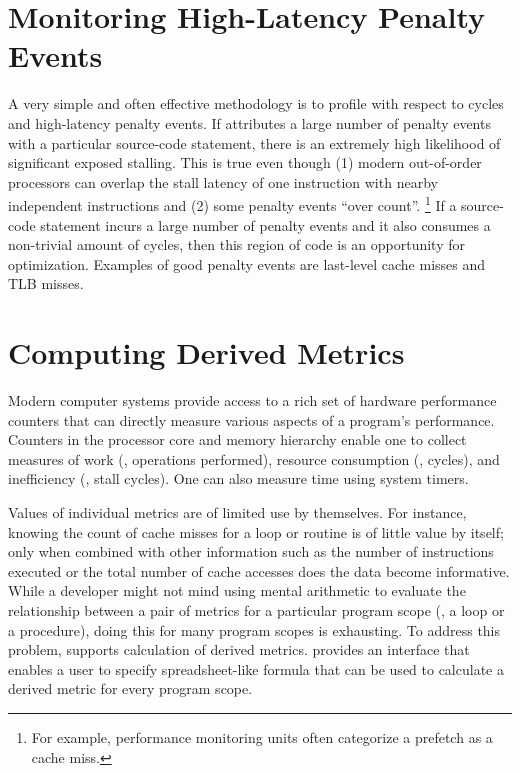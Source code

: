 \documentclass[11pt,twoside,letterpaper]{report}
\begin{document}

\section{Monitoring High-Latency Penalty Events}
\label{sec:effective-performance-analysis:penalty-events}

A very simple and often effective methodology is to profile with respect to cycles and high-latency penalty events.
If \HPCToolkit{} attributes a large number of penalty events with a particular source-code statement, there is an extremely high likelihood of significant exposed stalling.
This is true even though (1) modern out-of-order processors can overlap the stall latency of one instruction with nearby independent instructions and (2) some penalty events ``over count''.%
\footnote{For example, performance monitoring units often categorize a prefetch as a cache miss.}
If a source-code statement incurs a large number of penalty events and it also consumes a non-trivial amount of cycles, then this region of code is an opportunity for optimization.
Examples of good penalty events are last-level cache misses and TLB misses.



\section{Computing Derived Metrics}
\label{sec:effective-performance-analysis:derived-metrics}

Modern computer systems provide access to a rich set of hardware performance counters that can directly measure various aspects of a program's performance.
Counters in the processor core and memory hierarchy enable one to collect measures of work (\eg, operations performed), resource consumption (\eg, cycles), and inefficiency (\eg, stall cycles).
One can also measure time using system timers.

Values of individual metrics are of limited use by themselves.
For instance, knowing the count of cache misses for a loop or routine is of little value by itself; only when combined with other information such as the number of instructions executed or the total number of cache accesses does the data become informative.
While a developer might not mind using mental arithmetic to evaluate the relationship between a pair of metrics for a particular program scope (\eg, a loop or a procedure), doing this for many program scopes is exhausting.
To address this problem, \hpcviewer{} supports calculation of derived metrics.
\hpcviewer{} provides an interface that enables a user to specify spreadsheet-like formula that can be used to calculate a derived metric for every program scope.
\end{document}
